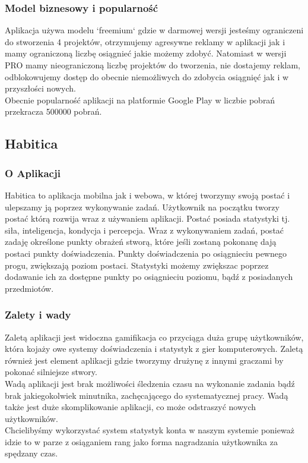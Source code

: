 \documentclass[a4paper,11pt]{report}
\begin{document}
\subsubsection{Model biznesowy i popularność}
Aplikacja używa modelu `freemium` gdzie w darmowej wersji jesteśmy ograniczeni do stworzenia 4 projektów, otrzymujemy agresywne reklamy w aplikacji jak i mamy ograniczoną liczbę osiągnieć jakie możemy zdobyć. Natomiast w wersji PRO mamy nieograniczoną liczbę projektów do tworzenia, nie dostajemy reklam, odblokowujemy dostęp do obecnie niemożliwych do zdobycia osiągnięć jak i w przyszłości nowych.\vspace{0,5cm}\\
Obecnie popularność aplikacji na platformie Google Play w liczbie pobrań przekracza 500000 pobrań.
\subsection{Habitica}
\subsubsection{O Aplikacji}
Habitica to aplikacja mobilna jak i webowa, w której tworzymy swoją postać i ulepszamy ją poprzez wykonywanie zadań. Użytkownik na początku tworzy postać którą rozwija wraz z używaniem aplikacji. Postać posiada statystyki tj. siła, inteligencja, kondycja i percepcja. Wraz z wykonywaniem zadań, postać zadaję określone punkty obrażeń stworą, które jeśli zostaną pokonanę dają postaci punkty doświadczenia. Punkty doświadczenia po osiągnieciu pewnego progu, zwiększają poziom postaci. Statystyki możemy zwiększac poprzez dodawanie ich za dostępne punkty po osiągnieciu poziomu, bądź z posiadanych przedmiotów.
\subsubsection{Zalety i wady}
Zaletą aplikacji jest widoczna gamifikacja co przyciąga duża grupę użytkowników, która kojaży owe systemy doświadczenia i statystyk z gier komputerowych. Zaletą również jest element aplikacji gdzie tworzymy drużynę z innymi graczami by pokonać silniejsze stwory.\vspace{0,5cm}\\Wadą aplikacji jest brak możliwości śledzenia czasu na wykonanie zadania bądź brak jakiegokolwiek minutnika, zachęcającego do systematycznej pracy. Wadą także jest duże skomplikowanie aplikacji, co może odstraszyć nowych użytkowników.\vspace{0,5cm}\\
Chcielibyśmy wykorzystać system statystyk konta w naszym systemie ponieważ idzie to w parze z osiąganiem rang jako forma nagradzania użytkownika za spędzany czas.
\end{document}

